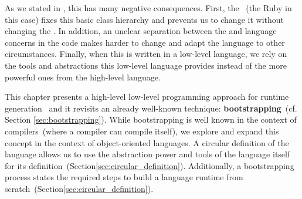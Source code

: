As we stated in , this has many negative consequences. First, the \VM~(the Ruby \VM in this case) fixes this basic class hierarchy and prevents us to change it without changing the \VM.
In addition, an unclear separation between the \VM and language concerns in the \VM code makes harder to change and adapt the language to other circumstances. Finally, when this \VM is written in a low-level language, we rely on the tools and abstractions this low-level language provides instead of the more powerful ones from the high-level language. 




This chapter presents a high-level low-level programming approach for runtime generation~\cite{Fram09a} and it revisits an already well-known technique: \textbf{bootstrapping}~(cf. Section \ref{sec:bootstrapping}). While bootstrapping is well known in the context of compilers~(where a compiler can compile itself), we explore and expand this concept in the context of object-oriented languages. A circular definition of the language allows us to use the abstraction power and tools of the language itself for its definition~(Section\ref{sec:circular_definition}). Additionally, a bootstrapping process states the required steps to build a language runtime from scratch~(Section\ref{sec:circular_definition}).

